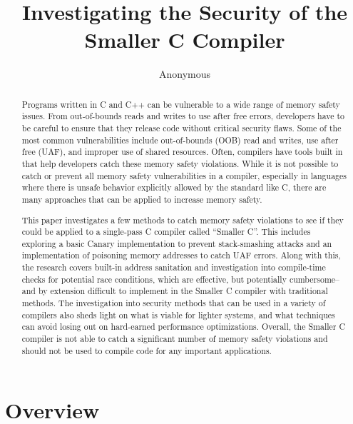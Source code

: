 \documentclass[sigconf, anonymous]{acmart}
\begin{document}
\title{Investigating the Security of the Smaller C Compiler}

\author{Anonymous}

\begin{abstract}

Programs written in C and C++ can be vulnerable to a wide range of memory safety issues. From out-of-bounds reads and writes to use after free errors, developers have to be careful to ensure that they release code without critical security flaws. Some of the most common vulnerabilities include out-of-bounds (OOB) read and writes, use after free (UAF), and improper use of shared resources. Often, compilers have tools built in that help developers catch these memory safety violations. While it is not possible to catch or prevent all memory safety vulnerabilities in a compiler, especially in languages where there is unsafe behavior explicitly allowed by the standard like C, there are many approaches that can be applied to increase memory safety.

This paper investigates a few methods to catch memory safety violations to see if they could be applied to a single-pass C compiler called “Smaller C”. This includes exploring a basic Canary implementation to prevent stack-smashing attacks and an implementation of poisoning memory addresses to catch UAF errors. Along with this, the research covers built-in address sanitation and investigation into compile-time checks for potential race conditions, which are effective, but potentially cumbersome– and by extension difficult to implement in the Smaller C compiler with traditional methods. The investigation into security methods that can be used in a variety of compilers also sheds light on what is viable for lighter systems, and what techniques can avoid losing out on hard-earned performance optimizations. Overall, the Smaller C compiler is not able to catch a significant number of memory safety violations and should not be used to compile code for any important applications.

\end{abstract}


\maketitle


\section{Overview}
\label{motivation}
\end{document}
